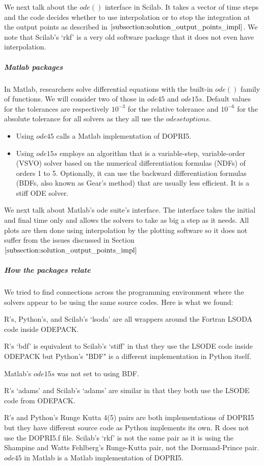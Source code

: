 We next talk about the $ode()$ interface in Scilab. It takes a vector of time steps and the code decides whether to use interpolation or to stop the integration at the output points as described in $\ref{subsection:solution_output_points_impl}$. We note that Scilab's `rkf' is a very old software package that it does not even have interpolation.

\subparagraph{Matlab packages}
In Matlab, researchers solve differential equations with the built-in $ode()$ family of functions. We will consider two of those in $ode45$ and $ode15s$.
Default values for the tolerances are respectively $10^{-3}$ for the relative tolerance and $10^{-6}$ for the absolute tolerance for all solvers as they all use the $odeset options$.

\begin{itemize}
\item Using $ode45$ calls a Matlab implementation of DOPRI5.
\item Using $ode15s$ employs an algorithm that is a variable-step, variable-order (VSVO) solver based on the numerical differentiation formulas (NDFs) of orders 1 to 5. Optionally, it can use the backward differentiation formulas (BDFs, also known as Gear's method) that are usually less efficient. It is a stiff ODE solver.
\end{itemize}

We next talk about Matlab's ode suite's interface. The interface takes the initial and final time only and allows the solvers to take as big a step as it needs. All plots are then done using interpolation by the plotting software so it does not suffer from the issues discussed in Section $\ref{subsection:solution_output_points_impl}$

\subparagraph{How the packages relate}
We tried to find connections across the programming environment where the solvers appear to be using the same source codes.
Here is what we found:

R's, Python's, and Scilab's `lsoda' are all wrappers around the Fortran LSODA code inside ODEPACK.

R's `bdf' is equivalent to Scilab's `stiff' in that they use the LSODE code inside ODEPACK but Python's "BDF" is a different implementation in Python itself.

Matlab's $ode15s$ was not set to using BDF.

R's `adams' and Scilab's `adams' are similar in that they both use the LSODE code from ODEPACK.

R's and Python's Runge Kutta 4(5) pairs are both implementations of DOPRI5 but they have different source code as Python implements its own. R does not use the DOPRI5.f file. Scilab's `rkf' is not the same pair as it is using the Shampine and Watts Fehlberg's Runge-Kutta pair, not the Dormand-Prince pair. $ode45$ in Matlab is a Matlab implementation of DOPRI5.

